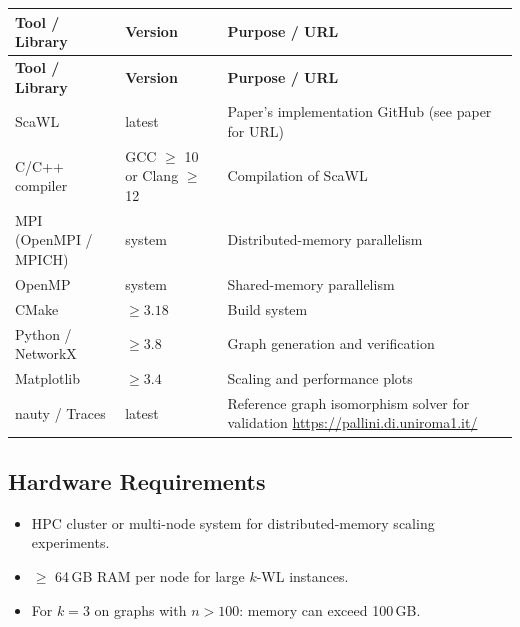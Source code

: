 \documentclass[11pt,a4paper]{article}
\begin{document}
\begin{longtable}{p{4.5cm} p{2.5cm} p{6.5cm}}
\toprule
\textbf{Tool / Library} & \textbf{Version} & \textbf{Purpose / URL} \\
\midrule
\endfirsthead
\toprule
\textbf{Tool / Library} & \textbf{Version} & \textbf{Purpose / URL} \\
\midrule
\endhead
ScaWL & latest & Paper's implementation \newline GitHub (see paper for URL) \\
\midrule
C/C++ compiler & GCC $\geq$ 10 or Clang $\geq$ 12 & Compilation of ScaWL \\
\midrule
MPI (OpenMPI / MPICH) & system & Distributed-memory parallelism \\
\midrule
OpenMP & system & Shared-memory parallelism \\
\midrule
CMake & $\geq 3.18$ & Build system \\
\midrule
Python / NetworkX & $\geq 3.8$ & Graph generation and verification \\
\midrule
Matplotlib & $\geq 3.4$ & Scaling and performance plots \\
\midrule
nauty / Traces & latest & Reference graph isomorphism solver for validation \newline \url{https://pallini.di.uniroma1.it/} \\
\bottomrule
\end{longtable}

\subsection{Hardware Requirements}
\begin{itemize}
  \item HPC cluster or multi-node system for distributed-memory scaling experiments.
  \item $\geq$ 64\,GB RAM per node for large $k$-WL instances.
  \item For $k=3$ on graphs with $n > 100$: memory can exceed 100\,GB.
\end{itemize}
\end{document}
